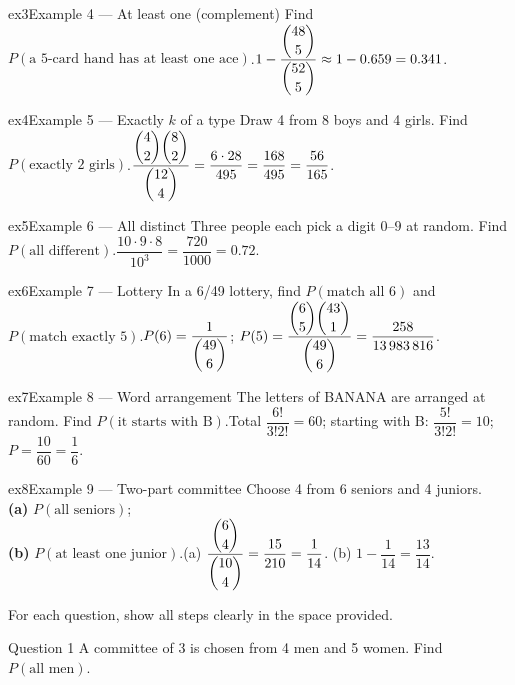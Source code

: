 \documentclass[11pt]{article}
\begin{document}
\begin{example}{ex3}{Example 4 --- At least one (complement)}
Find $P(\text{a 5-card hand has at least one ace})$.\soln $1-\dfrac{\dbinom{48}{5}}{\dbinom{52}{5}}\approx1-0.659=0.341$.
\end{example}

\begin{example}{ex4}{Example 5 --- Exactly $k$ of a type}
Draw 4 from 8 boys and 4 girls. Find $P(\text{exactly 2 girls})$.\soln $\dfrac{\dbinom{4}{2}\dbinom{8}{2}}{\dbinom{12}{4}}=\dfrac{6\cdot28}{495}=\dfrac{168}{495}=\dfrac{56}{165}$.
\end{example}

\begin{example}{ex5}{Example 6 --- All distinct}
Three people each pick a digit $0$--$9$ at random. Find $P(\text{all different})$.\soln $\dfrac{10\cdot9\cdot8}{10^3}=\dfrac{720}{1000}=0.72$.
\end{example}

\begin{example}{ex6}{Example 7 --- Lottery}
In a 6/49 lottery, find $P(\text{match all 6})$ and $P(\text{match exactly 5})$.\soln $P(6)=\dfrac{1}{\dbinom{49}{6}}$; $P(5)=\dfrac{\dbinom{6}{5}\dbinom{43}{1}}{\dbinom{49}{6}}=\dfrac{258}{13\,983\,816}$.
\end{example}

\begin{example}{ex7}{Example 8 --- Word arrangement}
The letters of BANANA are arranged at random. Find $P(\text{it starts with B})$.\soln Total $\dfrac{6!}{3!2!}=60$; starting with B: $\dfrac{5!}{3!2!}=10$; $P=\dfrac{10}{60}=\dfrac16$.
\end{example}

\begin{example}{ex8}{Example 9 --- Two-part committee}
Choose 4 from 6 seniors and 4 juniors. \\ \textbf{(a)} $P(\text{all seniors})$; \\ \textbf{(b)} $P(\text{at least one junior})$.\soln (a) $\dfrac{\dbinom{6}{4}}{\dbinom{10}{4}}=\dfrac{15}{210}=\dfrac{1}{14}$. (b) $1-\dfrac{1}{14}=\dfrac{13}{14}$.
\end{example}

\clearpage
{}
For each question, show all steps clearly in the space provided.

\begin{qbox}{Question 1}
A committee of 3 is chosen from 4 men and 5 women. Find $P(\text{all men})$.\workspace{2.4cm}
\end{qbox}
\end{document}
